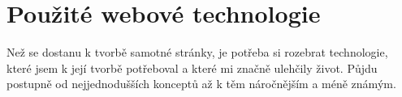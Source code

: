 \fancyhf{}
\rfoot{\helv \thepage}

\chapter{Použité webové technologie}
Než se dostanu k tvorbě samotné stránky, je potřeba si rozebrat technologie, které jsem k její tvorbě potřeboval a které mi značně ulehčily život. Půjdu postupně od nejjednodušších konceptů až k těm náročnějším a méně známým.


\newpage

\newpage

\newpage

\newpage

\newpage

\newpage

\newpage

\newpage

\newpage

\newpage

\newpage

\newpage

\newpage

\newpage